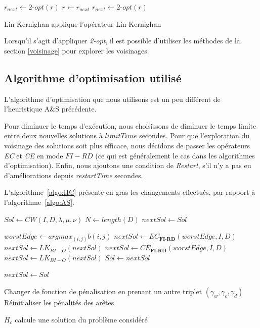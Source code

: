 \documentclass[a4paper,11pt]{article}%
\begin{document}
\begin{algorithm}
\DontPrintSemicolon %
$r_{next} \gets 2$-$opt(r) $\;
 {
  $r \gets r_{next}$\;
  $r_{next} \gets 2$-$opt(r)$\;
}
\;
\caption{{\sc Lin-Kernighan} applique l'opérateur Lin-Kernighan}
\label{algo:LK}
\end{algorithm}

Lorsqu'il s'agit d'appliquer \emph{2-opt}, il est possible d'utiliser les méthodes de la section \ref{voisinage} pour explorer les voisinages.

\subsection{Algorithme d'optimisation utilisé}
L'algorithme d'optimisation que nous utilisons est un peu différent de l'heuristique A\&S précédente.

Pour diminuer le temps d'exécution, nous choisissons de diminuer le temps limite entre deux nouvelles solutions à $limitTime$ secondes. 
Pour que l'exploration du voisinage des solutions soit plus efficace, nous décidons de passer les opérateurs \emph{EC} et \emph{CE} en mode $FI-RD$ (ce qui est généralement le cas dans les algorithmes d'optimisation).
Enfin, nous ajoutons une condition de \emph{Restart}, s'il n'y a pas eu d'améliorations depuis \emph{restartTime} secondes.

L'algorithme~\ref{algo:HC} présente en gras les changements effectués, par rapport à l'algorithme~\ref{algo:AS}.

\begin{algorithm}
\DontPrintSemicolon %
$Sol \gets CW(I,D,\lambda,\mu,\nu)$\;
$N \gets length(D)$\;
$nextSol \gets Sol$\;
 {
	$worstEdge \gets argmax_{(i,j)} b(i,j) $\;
	$nextSol \gets EC_{\textbf{FI-RD}}(worstEdge,I,D)$\;
	$nextSol \gets LK_{BI-O}(nextSol)$\;
	$nextSol \gets CE_{\textbf{FI-RD}}(worstEdge,I,D)$\;
	$nextSol \gets LK_{BI-O}(nextSol)$\;
	 {
		$ Sol \gets nextSol$\;
	}
	
	 {
		$nextSol \gets Sol$\;
	
	}
	
	 {
		Changer de fonction de pénalisation en prenant un autre triplet $(\gamma_w,\gamma_c,\gamma_d)$\;
		Réinitialiser les pénalités des arêtes\;
	}
	
}
\;
\caption{{\sc $H_c$} calcule une solution du problème considéré}
\label{algo:HC}
\end{algorithm}
\end{document}
